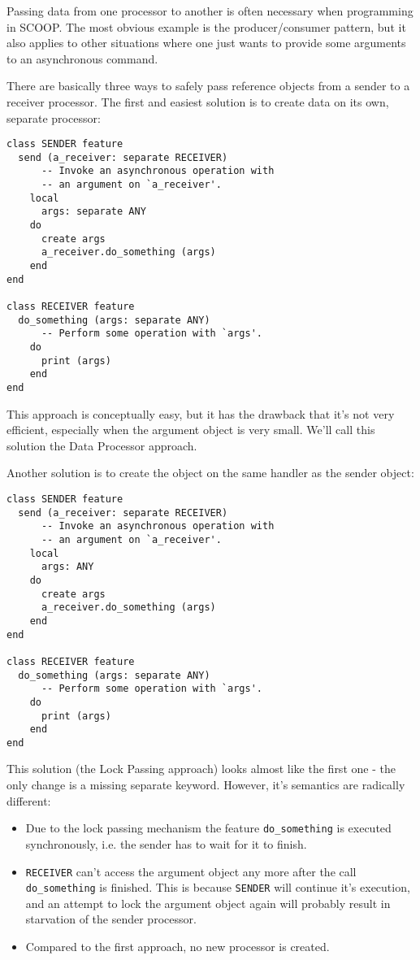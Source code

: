 \documentclass[a4paper,10pt]{article}
\begin{document}
Passing data from one processor to another is often necessary when programming in SCOOP.
The most obvious example is the producer/consumer pattern, but it also applies to other situations where one just wants to provide some arguments to an asynchronous command.


There are basically three ways to safely pass reference objects from a sender to a receiver processor.
The first and easiest solution is to create data on its own, separate processor: 
\begin{lstlisting}
class SENDER feature
  send (a_receiver: separate RECEIVER)
      -- Invoke an asynchronous operation with
      -- an argument on `a_receiver'.
    local
      args: separate ANY
    do
      create args
      a_receiver.do_something (args)
    end
end

class RECEIVER feature 
  do_something (args: separate ANY)
      -- Perform some operation with `args'.
    do
      print (args)
    end
end
\end{lstlisting}
This approach is conceptually easy, but it has the drawback that it's not very efficient, especially when the argument object is very small.
We'll call this solution the Data Processor approach.

Another solution is to create the object on the same handler as the sender object:
\begin{lstlisting}
class SENDER feature
  send (a_receiver: separate RECEIVER)
      -- Invoke an asynchronous operation with
      -- an argument on `a_receiver'.
    local
      args: ANY
    do
      create args
      a_receiver.do_something (args)
    end
end

class RECEIVER feature 
  do_something (args: separate ANY)
      -- Perform some operation with `args'.
    do
      print (args)
    end
end
\end{lstlisting}
This solution (the Lock Passing approach) looks almost like the first one - the only change is a missing separate keyword.
However, it's semantics are radically different:

\begin{itemize}
 \item Due to the lock passing mechanism \cite[p. 152]{Nienaltowski07} \cite{web:scoop} the feature \lstinline!do_something! is executed synchronously, i.e. the sender has to wait for it to finish.
 \item \lstinline!RECEIVER! can't access the argument object any more after the call \lstinline!do_something! is finished.
 This is because \lstinline!SENDER! will continue it's execution, and an attempt to lock the argument object again will probably result in starvation of the sender processor.
 \item Compared to the first approach, no new processor is created.
\end{itemize}
\end{document}
